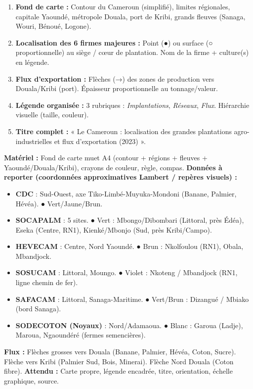 \documentclass[11pt]{article}
\begin{document}
\begin{methode}
\begin{enumerate}
    \item \textbf{Fond de carte :} Contour du Cameroun (simplifié), limites régionales, capitale Yaoundé, métropole Douala, port de Kribi, grands fleuves (Sanaga, Wouri, Bénoué, Logone).
    \item \textbf{Localisation des 6 firmes majeures :} Point (●) ou surface (○ proportionnelle) au siège / cœur de plantation. Nom de la firme + culture(s) en légende.
    \item \textbf{Flux d'exportation :} Flèches (→) des zones de production vers Douala/Kribi (port). Épaisseur proportionnelle au tonnage/valeur.
    \item \textbf{Légende organisée :} 3 rubriques : \textit{Implantations}, \textit{Réseaux}, \textit{Flux}. Hiérarchie visuelle (taille, couleur).
    \item \textbf{Titre complet :} « Le Cameroun : localisation des grandes plantations agro-industrielles et flux d'exportation (2023) ».
\end{enumerate}
\end{methode}

\begin{experience}
\textbf{Matériel :} Fond de carte muet A4 (contour + régions + fleuves + Yaoundé/Douala/Kribi), crayons de couleur, règle, compas.
\textbf{Données à reporter (coordonnées approximatives Lambert / repères visuels) :}
\begin{itemize}
    \item \textbf{CDC} : Sud-Ouest, axe Tiko-Limbé-Muyuka-Mondoni (Banane, Palmier, Hévéa). ● Vert/Jaune/Brun.
    \item \textbf{SOCAPALM} : 5 sites. ● Vert : Mbongo/Dibombari (Littoral, près Édéa), Eseka (Centre, RN1), Kienké/Mbonjo (Sud, près Kribi/Campo).
    \item \textbf{HEVECAM} : Centre, Nord Yaoundé. ● Brun : Nkolfoulou (RN1), Obala, Mbandjock.
    \item \textbf{SOSUCAM} : Littoral, Moungo. ● Violet : Nkoteng / Mbandjock (RN1, ligne chemin de fer).
    \item \textbf{SAFACAM} : Littoral, Sanaga-Maritime. ● Vert/Brun : Dizangué / Mbiako (bord Sanaga).
    \item \textbf{SODECOTON (Noyaux)} : Nord/Adamaoua. ● Blanc : Garoua (Ladje), Maroua, Ngaoundéré (fermes semencières).
\end{itemize}
\textbf{Flux :} Flèches grosses vers Douala (Banane, Palmier, Hévéa, Coton, Sucre). Flèche vers Kribi (Palmier Sud, Bois, Minerai). Flèche Nord \rightarrow Douala (Coton fibre).
\textbf{Attendu :} Carte propre, légende encadrée, titre, orientation, échelle graphique, source.
\end{experience}
\end{document}
